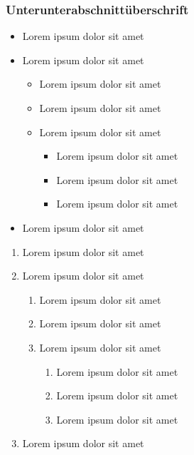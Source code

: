 \documentclass[12pt]{scrreprt}
\begin{document}
\subsubsection{Unterunterabschnittüberschrift}
	\label{sec:unterunterabschnitt}

\begin{itemize}
	\item Lorem ipsum dolor sit amet
	\item Lorem ipsum dolor sit amet
	\begin{itemize}
		\item Lorem ipsum dolor sit amet
		\item Lorem ipsum dolor sit amet
		\item Lorem ipsum dolor sit amet
		\begin{itemize}
			\item Lorem ipsum dolor sit amet
			\item Lorem ipsum dolor sit amet
			\item Lorem ipsum dolor sit amet
		\end{itemize}
	\end{itemize}
	\item Lorem ipsum dolor sit amet
\end{itemize}

\begin{enumerate}
	\item Lorem ipsum dolor sit amet
	\item Lorem ipsum dolor sit amet
	\begin{enumerate}
		\item Lorem ipsum dolor sit amet
		\item Lorem ipsum dolor sit amet
		\item Lorem ipsum dolor sit amet
		\begin{enumerate}
			\item Lorem ipsum dolor sit amet
			\item Lorem ipsum dolor sit amet
			\item Lorem ipsum dolor sit amet
		\end{enumerate}
	\end{enumerate}
	\item Lorem ipsum dolor sit amet
\end{enumerate}

\printbibliography
\end{document}
